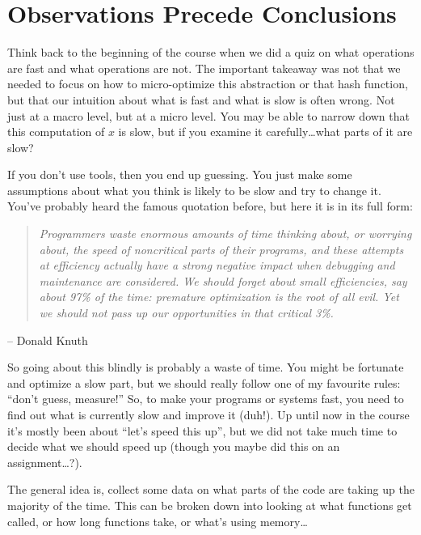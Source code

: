 




\section*{Observations Precede Conclusions}

Think back to the beginning of the course when we did a quiz on what operations are fast and what operations are not. The important takeaway was not that we needed to focus on how to micro-optimize this abstraction or that hash function, but that our intuition about what is fast and what is slow is often wrong. Not just at a macro level, but at a micro level. You may be able to narrow down that this computation of $x$ is slow, but if you examine it carefully\ldots what parts of it are slow?

If you don't use tools, then you end up guessing. You just make some assumptions about what you think is likely to be slow and try to change it. You've probably heard the famous quotation before, but here it is in its full form:

\begin{quote}
\textit{Programmers waste enormous amounts of time thinking about, or worrying about, the speed of noncritical parts of their programs, and these attempts at efficiency actually have a strong negative impact when debugging and maintenance are considered. We should forget about small efficiencies, say about 97\% of the time: premature optimization is the root of all evil. Yet we should not pass up our opportunities in that critical 3\%.}
\end{quote}
	\hfill -- Donald Knuth

So going about this blindly is probably a waste of time. You might be fortunate and optimize a slow part, but we should really follow one of my favourite rules: ``don't guess, measure!'' So, to make your programs or systems fast, you need to find out what is currently slow and improve it (duh!). Up until now in the course it's mostly been about ``let's speed this up'', but we did not take much time to decide what we should speed up (though you maybe did this on an assignment\ldots?).

The general idea is, collect some data on what parts of the code are taking up the majority of the time. This can be broken down into looking at what functions get called, or how long functions take, or what's using memory\ldots

